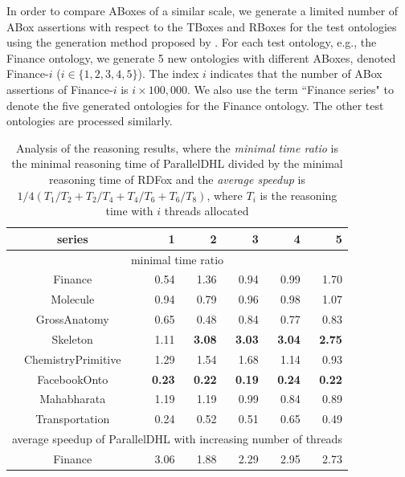 In order to compare ABoxes of a similar scale, we generate a limited
number of ABox assertions with respect to the TBoxes and RBoxes for
the test ontologies using the generation method proposed by
\citet{Elhaik98}.  For each test ontology, e.g., the Finance ontology,
we generate 5 new ontologies with different ABoxes, denoted
Finance-$i$ ($i\in\{1,2,3,4,5\}$). The index $i$ indicates that the
number of ABox assertions of Finance-$i$ is $i\times100,000$. We also
use the term ``Finance series" to denote the five generated ontologies
for the Finance ontology. The other test ontologies are processed
similarly.

\begin{table}[htb]
\centering
\caption{Analysis of the reasoning results, where the \emph{minimal time
  ratio} is the minimal reasoning time
of ParallelDHL divided by the minimal reasoning time of RDFox and the
\emph{average speedup} is $1/4 (T_1/T_2 + T_2/T_4 + T_4/T_6 + T_6/T_8)$,
 where $T_i$ is the reasoning time with $i$ threads allocated}
{\setlength{\tabcolsep}{6mm}
\begin{tabular}{crrrrr}
\hline
series & 1 & 2 & 3 & 4 & 5\\
\hline
\multicolumn{6}{c}{minimal time ratio}\\%
\hline
Finance&0.54&1.36&0.94&0.99&1.70\\
Molecule&0.94&0.79&0.96&0.98&1.07\\
GrossAnatomy&0.65&0.48&0.84&0.77&0.83\\
Skeleton&1.11&\textbf{3.08}&\textbf{3.03}&\textbf{3.04}&\textbf{2.75}\\
ChemistryPrimitive&1.29&1.54&1.68&1.14&0.93\\
FacebookOnto&\textbf{0.23}&\textbf{0.22}&\textbf{0.19}&\textbf{0.24}&\textbf{0.22}\\
Mahabharata&1.19&1.19&0.99&0.84&0.89\\
Transportation&0.24&0.52&0.51&0.65&0.49\\
\hline
\multicolumn{6}{c}{average speedup of ParallelDHL with increasing
  number of threads}\\%
\hline
Finance&3.06&1.88&2.29&2.95&2.73\\

\end{tabular}}
\end{table}
